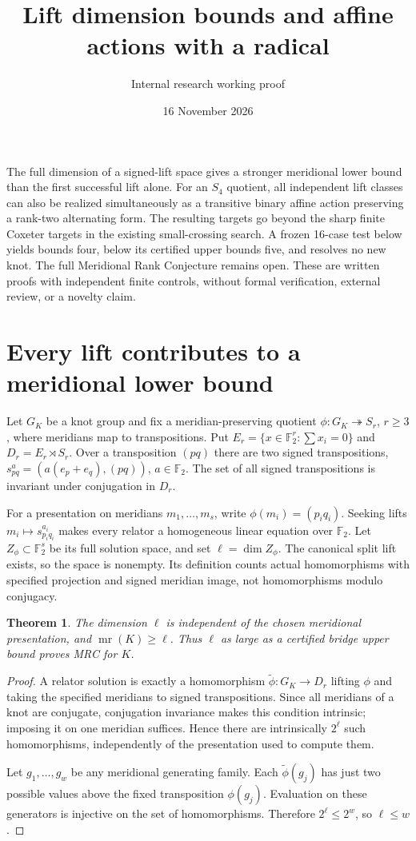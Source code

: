 \documentclass[11pt]{article}
\title{Lift dimension bounds and affine actions with a radical}
\author{Internal research working proof}
\date{16 November 2026}
\newtheorem{theorem}{Theorem}
\newcommand{\F}{\mathbb F}
\newcommand{\mr}{\operatorname{mr}}
\begin{document}
\maketitle

The full dimension of a signed-lift space gives a stronger meridional
lower bound than the first successful lift alone. For an $S_4$ quotient,
all independent lift classes can also be realized simultaneously as a
transitive binary affine action preserving a rank-two alternating form.
The resulting targets go beyond the sharp finite Coxeter targets in the
existing small-crossing search. A frozen 16-case test below yields bounds
four, below its certified upper bounds five, and resolves no new knot.
The full Meridional Rank Conjecture remains open. These are written
proofs with independent finite controls, without formal verification,
external review, or a novelty claim.

\section{Every lift contributes to a meridional lower bound}

Let $G_K$ be a knot group and fix a meridian-preserving quotient
$\phi:G_K\twoheadrightarrow S_r$, $r\ge3$, where meridians map to
transpositions. Put $E_r=\{x\in\F_2^r:\sum x_i=0\}$ and
$D_r=E_r\rtimes S_r$. Over a transposition $(pq)$ there are two signed
transpositions, $s_{pq}^a=(a(e_p+e_q),(pq))$, $a\in\F_2$.
The set of all signed transpositions is invariant under conjugation in
$D_r$.

For a presentation on meridians $m_1,\ldots,m_s$, write
$\phi(m_i)=(p_iq_i)$. Seeking lifts $m_i\mapsto s_{p_iq_i}^{a_i}$ makes
every relator a homogeneous linear equation over $\F_2$.
Let $Z_\phi\subset\F_2^s$ be its full solution space, and set
$\ell=\dim Z_\phi$. The canonical split lift exists, so the space is
nonempty. Its definition counts actual homomorphisms with specified
projection and signed meridian image, not homomorphisms modulo conjugacy.

\begin{theorem}\label{thm:count}
The dimension $\ell$ is independent of the chosen meridional presentation,
and $\mr(K)\ge\ell$. Thus $\ell$ as large as a certified bridge upper
bound proves MRC for $K$.
\end{theorem}
\begin{proof}
A relator solution is exactly a homomorphism
$\widetilde\phi:G_K\to D_r$ lifting $\phi$ and taking the specified
meridians to signed transpositions. Since all meridians of a knot are
conjugate, conjugation invariance makes this condition intrinsic; imposing
it on one meridian suffices. Hence there are intrinsically $2^\ell$ such
homomorphisms, independently of the presentation used to compute them.

Let $g_1,\ldots,g_w$ be any meridional generating family. Each
$\widetilde\phi(g_j)$ has just two possible values above the fixed
transposition $\phi(g_j)$. Evaluation on these generators is injective
on the set of homomorphisms. Therefore $2^\ell\le2^w$, so $\ell\le w$.
\end{proof}
\end{document}
